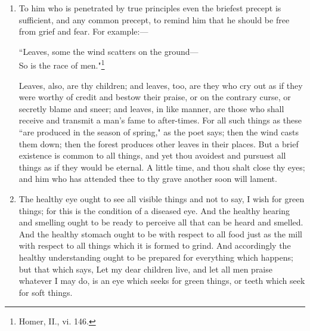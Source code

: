\begin{enumerate}
\item To him who is penetrated by true principles even the briefest precept is sufficient, and any common precept, to remind him that he should be free from grief and fear. For example:—
\begin{displayquote}
``Leaves, some the wind scatters on the ground—	\\
So is the race of men."\footnote{Homer, II., vi. 146.}
\end{displayquote}
Leaves, also, are thy children; and leaves, too, are they who cry out as if they were worthy of credit and bestow their praise, or on the contrary curse, or secretly blame and sneer; and leaves, in like manner, are those who shall receive and transmit a man's fame to after-times. For all such things as these ``are produced in the season of spring," as the poet says; then the wind casts them down; then the forest produces other leaves in their places. But a brief existence is common to all things, and yet thou avoidest and pursuest all things as if they would be eternal. A little time, and thou shalt close thy eyes; and him who has attended thee to thy grave another soon will lament.

\item The healthy eye ought to see all visible things and not to say, I wish for green things; for this is the condition of a diseased eye. And the healthy hearing and smelling ought to be ready to perceive all that can be heard and smelled. And the healthy stomach ought to be with respect to all food just as the mill with respect to all things which it is formed to grind. And accordingly the healthy understanding ought to be prepared for everything which happens; but that which says, Let my dear children live, and let all men praise whatever I may do, is an eye which seeks for green things, or teeth which seek for soft things.


\end{enumerate}
